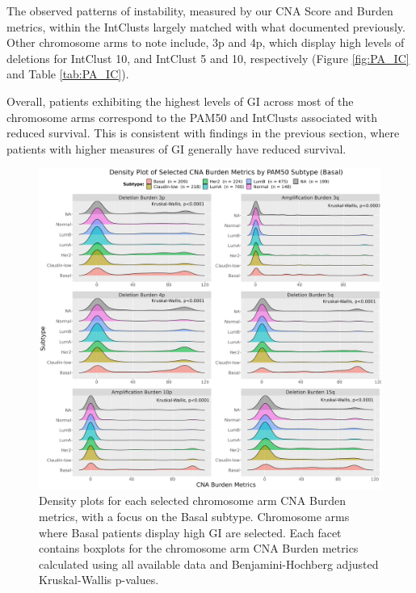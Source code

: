 The observed patterns of instability, measured by our CNA Score and Burden metrics, within the IntClusts largely matched with what \cite{pmid22522925} documented previously. Other chromosome arms to note include, 3p and 4p, which display high levels of deletions for IntClust 10, and IntClust 5 and 10, respectively (Figure \ref{fig:PA_IC} and Table \ref{tab:PA_IC}). 

Overall, patients exhibiting the highest levels of GI across most of the chromosome arms correspond to the PAM50 and IntClusts associated with reduced survival. This is consistent with findings in the previous section, where patients with higher measures of GI generally have reduced survival.

\vfill
\begin{figure}[!h]
\center
\includegraphics[width=1\textwidth]{../figures/Chapter_2/ChrArm_CNA_Burden_Metrics_Across_PAM50_Basal_Burden.png}
\caption[Density plots for each selected chromosome arm CNA Burden metrics, with a focus on the Basal subtype.]{Density plots for each selected chromosome arm CNA Burden metrics, with a focus on the Basal subtype. Chromosome arms where Basal patients display high GI are selected. Each facet contains boxplots for the chromosome arm CNA Burden metrics calculated using all available data and Benjamini-Hochberg adjusted Kruskal-Wallis p-values.}
\label{fig:PA-CNA-Score-Metric-Density-P50-5q}
\end{figure}
\vfill

